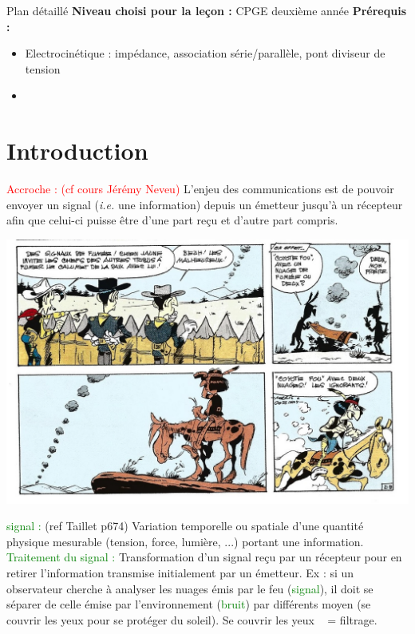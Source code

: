 \begin{reportBlock}{Plan détaillé}
  \textbf{Niveau choisi pour la leçon :} CPGE deuxième année
  \newline
  \textbf{Prérequis : }
  \begin{itemize}
      \item Electrocinétique : impédance, association série/parallèle, pont diviseur de tension 
      \item 
  \end{itemize}


\section*{Introduction}
\textcolor{red}{Accroche : (cf cours Jérémy Neveu) }L'enjeu des communications est de pouvoir envoyer un signal (\textit{i.e.} une information) depuis un émetteur jusqu'à un récepteur afin que celui-ci puisse être d'une part reçu et d'autre part compris.
\begin{center}
    \includegraphics[scale=0.8]{LP_TraitementSignal/Codage_LuckyLuke.jpg}
\end{center}
\textcolor{green}{signal :} (ref Taillet p674) Variation temporelle ou spatiale d'une quantité physique mesurable (tension, force, lumière, ...) portant une information.\\
\textcolor{green}{Traitement du signal :} Transformation d'un signal reçu par un récepteur pour en retirer l'information transmise initialement par un émetteur. Ex : si un observateur cherche à analyser les nuages émis par le feu (\textcolor{green}{signal}), il doit se séparer de celle émise par l'environnement (\textcolor{green}{bruit}) par différents moyen (se couvrir les yeux pour se protéger du soleil). \og Se couvrir les yeux \fg~ = filtrage.


\end{reportBlock}
